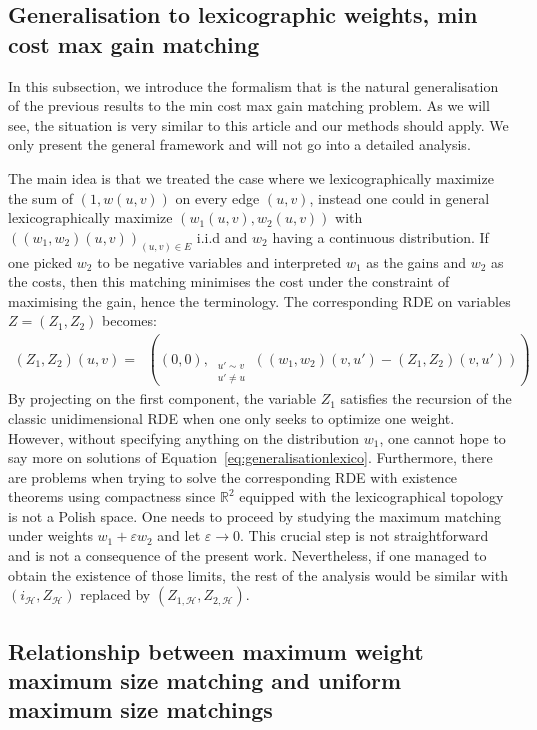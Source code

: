 \documentclass[11pt]{article}
\DeclareMathOperator{\lex}{lex}
\DeclareMathOperator*{\maxlex}{\overset{\lex}{\max}}
\newcommand{\eps}{\varepsilon}
\begin{document}
\subsection{Generalisation to lexicographic weights, min cost max gain  matching}
In this subsection, we introduce the formalism that is the natural generalisation of the previous results to the min cost max gain matching problem. As we will see, the situation is very similar to this article and our methods should apply. We only present the general framework and will not go into a detailed analysis.

The main idea is that we treated the case where we lexicographically maximize the sum of $(1,w(u,v))$ on every edge $(u,v)$, instead one could in general lexicographically maximize $(w_1(u,v),w_2(u,v))$ with $((w_1,w_2)(u,v))_{(u,v) \in E}$ i.i.d and $w_2$ having a continuous distribution. If one picked $w_2$ to be negative variables and interpreted $w_1$ as the gains and $w_2$ as the costs, then this matching minimises the cost under the constraint of maximising the gain, hence the terminology. The corresponding RDE on variables $Z=(Z_1,Z_2)$  becomes:
\begin{equation}\label{eq:generalisationlexico}
    \begin{aligned}
        (Z_1,Z_2)(u,v)=\maxlex \left( (0,0) , \maxlex _{\substack{ u' \sim v \\ u' \neq u}}\left( (w_1,w_2)(v,u')  -(Z_1,Z_2)(v,u') \right) \right)
    \end{aligned}
\end{equation}
By projecting on the first component, the variable $Z_1$ satisfies the recursion of the classic unidimensional RDE when one only seeks to optimize one weight. However, without specifying anything on the distribution $w_1$, one cannot hope to say more on solutions of Equation~\eqref{eq:generalisationlexico}. Furthermore, there are problems when trying to solve the corresponding RDE with existence theorems using compactness since $\mathbb{R}^2$ equipped with the lexicographical topology is not a Polish space. One needs to proceed by studying the maximum matching under weights $w_1+\eps   w_2$ and let $\eps \rightarrow 0$. This crucial step is not straightforward and is not a consequence of the present work. Nevertheless, if one managed to obtain the existence of those limits, the rest of the analysis would be similar with $(i_{\mathcal{H}},Z_{\mathcal{H}})$ replaced by $(Z_{1,{\mathcal{H}}},Z_{2,{\mathcal{H}}})$.


\subsection{Relationship between maximum weight maximum size matching and uniform maximum size matchings}
\end{document}

